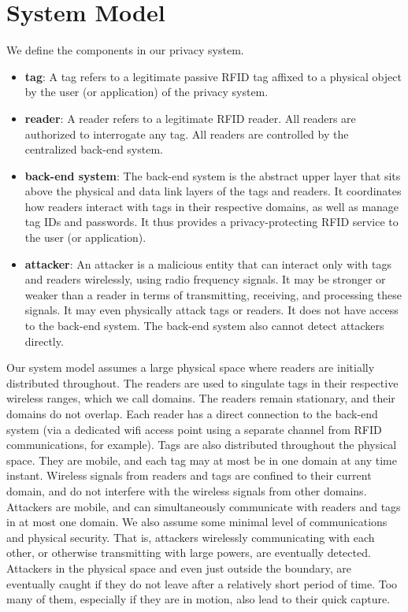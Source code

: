 \section{System Model}
\label{sec:System_Model}
We define the components in our privacy system.
\begin{itemize}
\item \textbf{tag}: A tag refers to a legitimate passive RFID tag affixed to a physical object by the user (or application) of the privacy system.
\item \textbf{reader}:  A reader refers to a legitimate RFID reader.  All readers are authorized to interrogate any tag.  All readers are controlled by the centralized back-end system.
\item \textbf{back-end system}:  The back-end system is the abstract upper layer that sits above the physical and data link layers of the tags and readers.  It coordinates how readers interact with tags in their respective domains, as well as manage tag IDs and passwords.  It thus provides a privacy-protecting RFID service to the user (or application).
\item \textbf{attacker}:  An attacker is a malicious entity that can interact only with tags and readers wirelessly, using radio frequency signals.  It may be stronger or weaker than a reader in terms of transmitting, receiving, and processing these signals.  It may even physically attack tags or readers.  It does not have access to the back-end system.  The back-end system also cannot detect attackers directly.
\end{itemize}

Our system model assumes a large physical space where readers are initially distributed throughout.  The readers are used to singulate tags in their respective wireless ranges, which we call domains.  The readers remain stationary, and their domains do not overlap.  Each reader has a direct connection to the back-end system (via a dedicated wifi access point using a separate channel from RFID communications, for example).  Tags are also distributed throughout the physical space.  They are mobile, and each tag may at most be in one domain at any time instant.  Wireless signals from readers and tags are confined to their current domain, and do not interfere with the wireless signals from other domains.  Attackers are mobile, and can simultaneously communicate with readers and tags in at most one domain.  We also assume some minimal level of communications and physical security.  That is, attackers wirelessly communicating with each other, or otherwise transmitting with large powers, are eventually detected.  Attackers in the physical space and even just outside the boundary, are eventually caught if they do not leave after a relatively short period of time.  Too many of them, especially if they are in motion, also lead to their quick capture.

